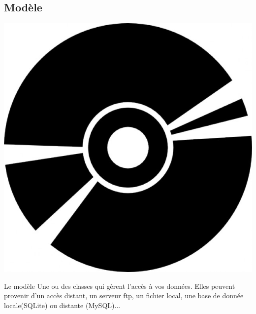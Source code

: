 \documentclass{beamer}
\begin{document}
\subsection{Modèle}
\begin{frame}
\begin{center}
\includegraphics[scale=0.2]{data.jpeg}
\end{center}
\begin{block}{Le modèle}
Une ou des classes qui gèrent l'accès à vos données. Elles peuvent provenir d'un accès distant, un serveur ftp, un fichier local, une base de donnée locale(SQLite) ou distante (MySQL)...
\end{block}
\end{frame}
\end{document}
